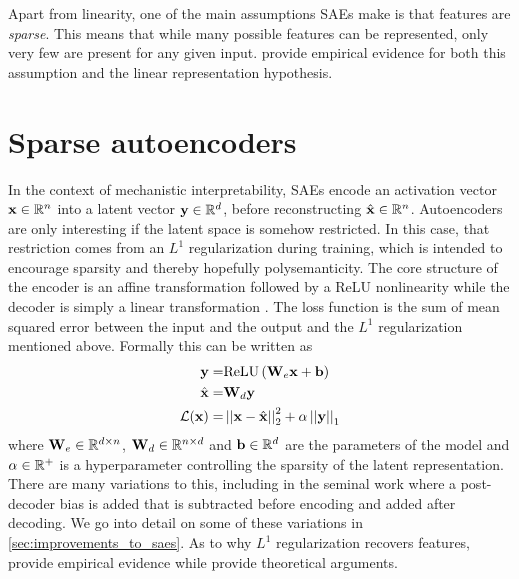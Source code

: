 Apart from linearity, one of the main assumptions SAEs make is that features are \emph{sparse}.
This means that while many possible features can be represented, only very few are present for any given input.
\cite{deng_measuring_2023} provide empirical evidence for both this assumption and the linear representation hypothesis.

\section{Sparse autoencoders}
In the context of mechanistic interpretability, SAEs  encode an activation vector $\mathbf{x}\in\mathbb{R}^{n}$ into a latent vector $\mathbf{y}\in\mathbb{R}^d$, before reconstructing $\hat{\mathbf{x}}\in\mathbb{R}^n$.
Autoencoders are only interesting if the latent space is somehow restricted.
In this case, that restriction comes from an $L^1$ regularization during training, which is intended to encourage sparsity and thereby hopefully polysemanticity.
The core structure of the encoder is an affine transformation followed by a ReLU nonlinearity while the decoder is simply a linear transformation \cite{cunningham_sparse_2023}.
The loss function is the sum of mean squared error between the input and the output and the $L^1$ regularization mentioned above.
Formally this can be written as
\begin{align*}
    \mathbf{y}=&\mathrm{ReLU}\left(\mathbf{W}_e\mathbf{x}+\mathbf{b}\right)\\
    \hat{\mathbf{x}}=&\mathbf{W}_d\mathbf{y}\\
    \mathcal L(\mathbf{x})=&\left\lvert\left\lvert\mathbf{x}-\hat{\mathbf{x}}\right\lvert\right\lvert_2^2+\alpha\left\lvert\left\lvert\mathbf{y}\right\lvert\right\lvert_1
\end{align*}
where $\mathbf{W}_e\in\mathbb{R}^{d\times n}$, $\mathbf{W}_d\in\mathbb{R}^{n\times d}$ and $\mathbf{b}\in\mathbb{R}^d$ are the parameters of the model and $\alpha\in\mathbb{R}^+$ is a hyperparameter controlling the sparsity of the latent representation.
There are many variations to this, including in the seminal work \cite{bricken_towards_2023} where a post-decoder bias is added that is subtracted before encoding and added after decoding.
We go into detail on some of these variations in \ref{sec:improvements_to_saes}.
As to why $L^1$ regularization recovers features, \cite{sharkey_interim_2022} provide empirical evidence while \cite{wright_high-dimensional_2022} provide theoretical arguments.



